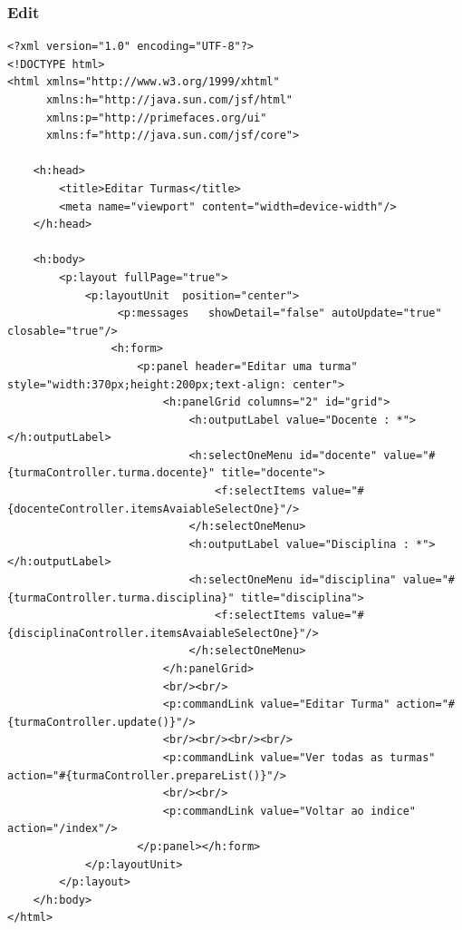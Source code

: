 \documentclass[12pt,a4paper]{article}
\begin{document}
\subsubsection{Edit}
\label{subsubsectionTurmaEdit}
\begin{lstlisting}
<?xml version="1.0" encoding="UTF-8"?>
<!DOCTYPE html>
<html xmlns="http://www.w3.org/1999/xhtml"
      xmlns:h="http://java.sun.com/jsf/html"
      xmlns:p="http://primefaces.org/ui"
      xmlns:f="http://java.sun.com/jsf/core">

    <h:head>
        <title>Editar Turmas</title>
        <meta name="viewport" content="width=device-width"/>
    </h:head>
    
    <h:body>
        <p:layout fullPage="true"> 
            <p:layoutUnit  position="center">
                 <p:messages   showDetail="false" autoUpdate="true" closable="true"/>
                <h:form>
                    <p:panel header="Editar uma turma" style="width:370px;height:200px;text-align: center">  
                        <h:panelGrid columns="2" id="grid">  
                            <h:outputLabel value="Docente : *"></h:outputLabel>  
                            <h:selectOneMenu id="docente" value="#{turmaController.turma.docente}" title="docente">
                                <f:selectItems value="#{docenteController.itemsAvaiableSelectOne}"/>
                            </h:selectOneMenu>
                            <h:outputLabel value="Disciplina : *"></h:outputLabel>  
                            <h:selectOneMenu id="disciplina" value="#{turmaController.turma.disciplina}" title="disciplina">
                                <f:selectItems value="#{disciplinaController.itemsAvaiableSelectOne}"/>
                            </h:selectOneMenu>
                        </h:panelGrid>  
                        <br/><br/>
                        <p:commandLink value="Editar Turma" action="#{turmaController.update()}"/>
                        <br/><br/><br/><br/>
                        <p:commandLink value="Ver todas as turmas" action="#{turmaController.prepareList()}"/>
                        <br/><br/>
                        <p:commandLink value="Voltar ao indice" action="/index"/>
                    </p:panel></h:form>
            </p:layoutUnit>
        </p:layout>
    </h:body>
</html>
\end{lstlisting}
\end{document}

